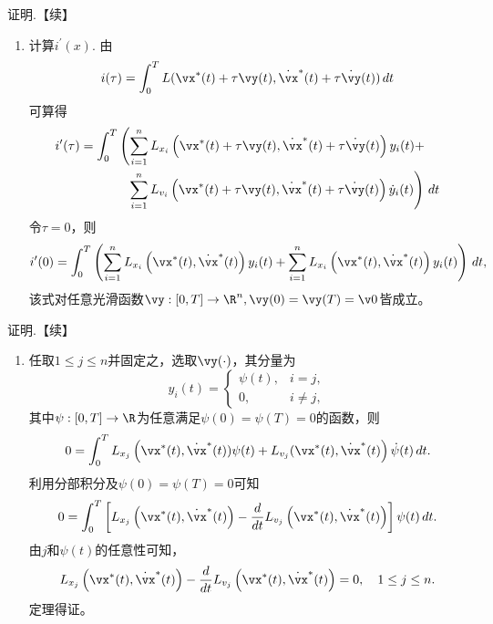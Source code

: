 \begin{frame}{\subsecname}
    \begin{block}{证明.【续】}
    \begin{enumerate}[2]
        \item 计算$i^\prime(x)$. 由
        $$
        i(\tau) = \int_0^T L(\vx^*(t)+\tau\vy(t), \dot\vx^*(t)+\tau\dot\vy(t))\,dt
        $$
        可算得
        $$
        \begin{aligned}
        i^\prime(\tau) = \int_0^T&\left(\sum_{i=1}^nL_{x_i}\left(\vx^*(t)+\tau\vy(t), \dot\vx^*(t)+\tau\dot\vy(t)\right)y_i(t) + \right.\\
        &~~\left.\sum_{i=1}^nL_{v_i}\left(\vx^*(t)+\tau\vy(t), \dot\vx^*(t)+\tau\dot\vy(t)\right)\dot y_i(t)\right)\,dt
        \end{aligned}
        $$
        令$\tau=0$，则
        $$
        i^\prime(0) = \int_0^T\left(\sum_{i=1}^nL_{x_i}\left(\vx^*(t), \dot\vx^*(t)\right)y_i(t) +\sum_{i=1}^nL_{x_i}\left(\vx^*(t), \dot\vx^*(t)\right)y_i(t)\right)\,dt, 
        $$
        该式对任意光滑函数$\vy: [0,T]\to \R^n, \vy(0)=\vy(T)=\v0$皆成立。
     \end{enumerate}
    \end{block}
\end{frame}

\begin{frame}{\subsecname}
    \begin{block}{证明.【续】}
    \begin{enumerate}[3]
        \item  任取$1\le j \le n$并固定之，选取$\vy(\cdot)$，其分量为
        $$
        y_i(t) = \left\{
        \begin{array}{cc}
            \psi(t),  &  i=j,\\
            0,   & i\ne j,
        \end{array}
        \right.
        $$
        其中$\psi:[0,T]\to \R$为任意满足$\psi(0)=\psi(T)=0$的函数，则
        $$
        0 = \int_0^T L_{x_j}\left(\vx^*(t), \dot\vx^*(t))\psi(t) + L_{v_j}(\vx^*(t),\dot\vx^*(t)\right) \dot\psi(t)\,dt.
        $$
        利用分部积分及$\psi(0)=\psi(T)=0$可知
        $$
        0 = \int_0^T \left[L_{x_j}\left(\vx^*(t), \dot\vx^*(t)\right) - \frac{d}{dt}L_{v_j}\left(\vx^*(t),\dot\vx^*(t)\right)\right] \psi(t)\,dt.
        $$
        由$j$和$\psi(t)$的任意性可知，
        $$
        L_{x_j}\left(\vx^*(t), \dot\vx^*(t)\right) - \frac{d}{dt}L_{v_j}\left(\vx^*(t),\dot\vx^*(t)\right) = 0, \quad 1 \le j \le n. 
        $$
        定理得证。
    \end{enumerate}
    \end{block}
\end{frame}

